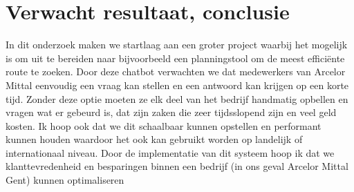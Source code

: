 \section{Verwacht resultaat, conclusie}%
\label{sec:verwachte_resultaten}
In dit onderzoek maken we startlaag aan een groter project waarbij het mogelijk is om uit te bereiden naar bijvoorbeeld een planningstool om de meest efficiënte route te zoeken.
Door deze chatbot verwachten we dat medewerkers van Arcelor Mittal eenvoudig een vraag kan stellen en een antwoord kan krijgen op een korte tijd.
Zonder deze optie moeten ze elk deel van het bedrijf handmatig opbellen en vragen wat er gebeurd is, dat zijn zaken die zeer tijdsslopend zijn en veel geld kosten.
Ik hoop ook dat we dit schaalbaar kunnen opstellen en performant kunnen houden waardoor het ook kan gebruikt worden op landelijk of internationaal niveau.
Door de implementatie van dit systeem hoop ik dat we klanttevredenheid en besparingen binnen een bedrijf (in ons geval Arcelor Mittal Gent) kunnen optimaliseren
